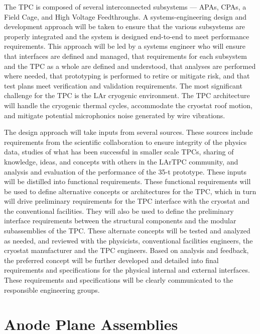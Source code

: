 The TPC is composed of several interconnected subsystems --- APAs, CPAs, a Field Cage, and High Voltage 
Feedthroughs. A systems-engineering design and development approach will be taken to ensure that the 
various subsystems are properly integrated and the system is designed end-to-end to meet performance 
requirements. This approach will be led by a systems engineer who will ensure that interfaces are defined 
and managed, that requirements for each subsystem and the TPC as a whole are defined and understood, 
that analyses are performed where needed, that prototyping is performed to retire or mitigate risk, and that test 
plans meet verification and validation requirements. The most significant challenge for the TPC is the LAr 
cryogenic environment. The TPC architecture will handle the cryogenic thermal cycles, accommodate the 
cryostat roof motion, and mitigate potential microphonics noise generated by wire vibrations.

The design approach will take inputs from several sources.  These sources include requirements from the scientific collaboration to ensure integrity of the physics data, studies of what has been successful in smaller scale TPCs, sharing of knowledge, ideas, and concepts with others in the LArTPC community, and analysis and evaluation of the performance of the 35-t prototype.  These inputs will be distilled into functional requirements.  These functional requirements will be used to define alternative concepts or architectures for the TPC, which in turn will drive preliminary requirements for the TPC interface with the cryostat and the conventional facilities.  They will also be used to define the preliminary interface requirements between the structural components and the modular subassemblies of the TPC.  These alternate concepts will be tested and analyzed as needed, and reviewed with the physicists, conventional facilities engineers, the cryostat manufacturer and the TPC engineers.  Based on analysis and feedback, the preferred concept will be further developed and detailed into final requirements and specifications for the physical internal and external interfaces.  These requirements and specifications will be clearly communicated to the responsible engineering groups.


\section{Anode Plane Assemblies}
\label{subsec:v5-tpc-chamber-apa}

